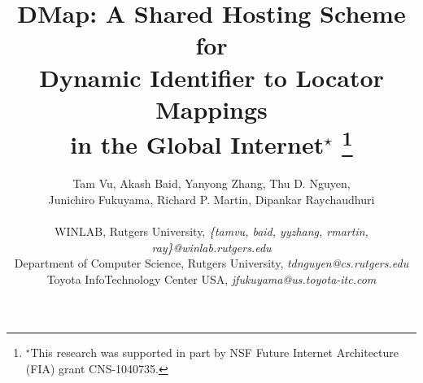 \documentclass[10pt,conference,compsocconf,letterpaper]{IEEEtran}
\begin{document}
\pagestyle{empty}
\title{DMap: A Shared Hosting Scheme for \\ Dynamic Identifier to
  Locator Mappings \\ in the Global Internet$^{\star}$
\thanks{$^{\star}$This research was supported in part by NSF Future Internet Architecture (FIA) grant CNS-1040735.}
}

\author{Tam Vu,
    Akash Baid,
    Yanyong Zhang,
    Thu D. Nguyen, \\
    Junichiro Fukuyama,
    Richard P. Martin,
    Dipankar Raychaudhuri  \\ \\
   WINLAB, Rutgers University, {\em\{tamvu, baid, yyzhang, rmartin, ray\}@winlab.rutgers.edu}
  \\  Department of Computer Science, Rutgers University, {\em tdnguyen@cs.rutgers.edu}
  \\  Toyota InfoTechnology Center USA, {\em jfukuyama@us.toyota-itc.com }
}


\maketitle
\begin{abstract}
    
\end{abstract}

\newcommand{\arcName}{DMap}


%
%




%





{\scriptsize


}

%	
%	
\end{document}
